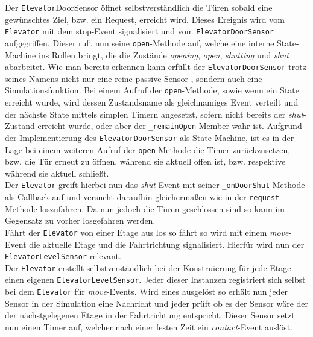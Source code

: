 Der \texttt{Elevator}DoorSensor öffnet selbstverständlich die Türen sobald eine gewünschtes Ziel, bzw. ein Request, erreicht wird.
Dieses Ereignis wird vom \texttt{Elevator} mit dem \glqq stop\grqq-Event signalisiert und vom \texttt{ElevatorDoorSensor} aufgegriffen.
Dieser ruft nun seine \texttt{open}-Methode auf, welche eine interne State-Machine ins Rollen bringt, die die Zustände \textit{opening}, \textit{open}, \textit{shutting} und \textit{shut} abarbeitet.
Wie man bereits erkennen kann erfüllt der \texttt{ElevatorDoorSensor} trotz seines Namens nicht nur eine reine passive Sensor-, sondern auch eine Simulationsfunktion.
Bei einem Aufruf der \texttt{open}-Methode, sowie wenn ein State erreicht wurde, wird dessen Zustandsname als gleichnamiges Event verteilt und der nächste State mittels simplen Timern angesetzt, sofern nicht bereits der \textit{shut}-Zustand erreicht wurde, oder aber der \texttt{\_remainOpen}-Member wahr ist.
Aufgrund der Implementierung des \texttt{ElevatorDoorSensor} als State-Machine, ist es in der Lage bei einem weiteren Aufruf der \texttt{open}-Methode die Timer zurückzusetzen, bzw. die Tür erneut zu öffnen, während sie aktuell offen ist, bzw. respektive während sie aktuell schließt. \\

Der \texttt{Elevator} greift hierbei nun das \textit{shut}-Event mit seiner \texttt{\_onDoorShut}-Methode als Callback auf und versucht daraufhin gleichermaßen wie in der \texttt{request}-Methode loszufahren.
Da nun jedoch die Türen geschlossen sind so kann im Gegensatz zu vorher losgefahren werden. \\

Fährt der \texttt{Elevator} von einer Etage aus los so fährt so wird mit einem \textit{move}-Event die aktuelle Etage und die Fahrtrichtung signalisiert.
Hierfür wird nun der \texttt{ElevatorLevelSensor} relevant. \\

Der \texttt{Elevator} erstellt selbstverständlich bei der Konstruierung für jede Etage einen eigenen \texttt{ElevatorLevelSensor}.
Jeder dieser Instanzen registriert sich selbst bei dem \texttt{Elevator} für \textit{move}-Events.
Wird eines ausgelöst so erhält nun jeder Sensor in der Simulation eine Nachricht und jeder prüft ob es der Sensor wäre der der nächstgelegenen Etage in der Fahrtrichtung entspricht.
Dieser Sensor setzt nun einen Timer auf, welcher nach einer festen Zeit ein \textit{contact}-Event auslöst. \\

